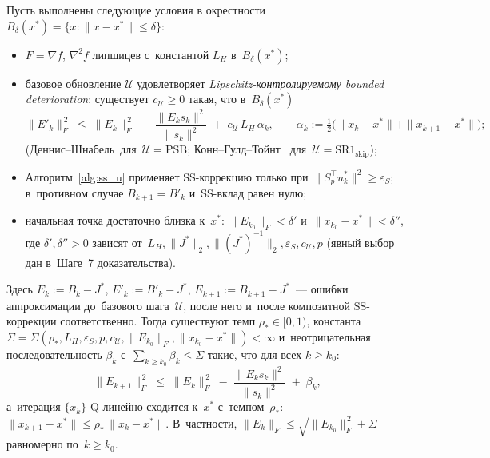 \begin{lemma}
\label{lem:bd_composite}
Пусть выполнены следующие условия в окрестности $B_\delta(x^*)=\{x:\|x-x^*\|\le\delta\}$:
\begin{itemize}
  \item[\textup{(A1)}] $F=\nabla f$, $\nabla^2 f$ липшицев с~константой $L_H$ в~$B_\delta(x^*)$;
  \item[\textup{(A2)}] базовое обновление $\mathcal{U}$ удовлетворяет
        \emph{Lipschitz-контролируемому bounded deterioration}: существует
        $c_{\mathcal{U}}\ge 0$ такая, что в~$B_\delta(x^*)$
        \begin{equation}\label{eq:bd_base}
          \|E'_k\|_F^{\,2}
          \;\le\; \|E_k\|_F^{\,2}
                 \;-\; \frac{\|E_k s_k\|^2}{\|s_k\|^2}
                 \;+\; c_{\mathcal{U}}\, L_H\, \alpha_k,
          \qquad
          \alpha_k:=\tfrac12\bigl(\|x_k-x^*\|+\|x_{k+1}-x^*\|\bigr);
        \end{equation}
        (Деннис--Шнабель~\cite[\S 6.4]{bfgs}для~$\mathcal{U}=\mathrm{PSB}$;
         Конн--Гулд--Тойнт~\cite{conn1991} для~$\mathcal{U}=\mathrm{SR1}_{\mathrm{skip}}$);
  \item[\textup{(A3)}] Алгоритм~\ref{alg:ss_u} применяет SS-коррекцию только при
        $\|S_p^{\top} u_k^*\|^2 \ge \varepsilon_S$; в~противном случае
        $B_{k+1}=B'_k$ и~SS-вклад равен нулю;
  \item[\textup{(A4)}] начальная точка достаточно близка к~$x^{*}$:
        $\|E_{k_0}\|_F < \delta'$ и~$\|x_{k_0}-x^{*}\| < \delta''$, где
        $\delta',\delta''>0$ зависят от~$L_H,\|J^{*}\|_2,\|(J^{*})^{-1}\|_2,
        \varepsilon_S,c_{\mathcal{U}},p$ (явный выбор дан в~Шаге~7
        доказательства).
\end{itemize}
Здесь $E_k:=B_k-J^*$, $E'_k:=B'_k-J^*$, $E_{k+1}:=B_{k+1}-J^*$~---
ошибки аппроксимации до~базового шага~$\mathcal{U}$, после него и~после
композитной SS-коррекции соответственно. Тогда существуют темп $\rho_*\in[0,1)$,
константа $\Sigma=\Sigma(\rho_*,L_H,\varepsilon_S,p,c_{\mathcal{U}},
\|E_{k_0}\|_F,\|x_{k_0}-x^*\|)<\infty$ и~неотрицательная последовательность
$\beta_k$ с~$\sum_{k\ge k_0}\beta_k\le\Sigma$ такие, что для всех $k\ge k_0$:
\begin{equation}\label{eq:bd_composite}
  \|E_{k+1}\|_F^{\,2}
  \;\le\; \|E_k\|_F^{\,2}
         \;-\; \frac{\|E_k s_k\|^2}{\|s_k\|^2}
         \;+\; \beta_k,
\end{equation}
а~итерация $\{x_k\}$ Q-линейно сходится к~$x^{*}$ с~темпом~$\rho_*$:
$\|x_{k+1}-x^{*}\|\le\rho_*\,\|x_k-x^{*}\|$. В~частности,
$\|E_k\|_F\le\sqrt{\|E_{k_0}\|_F^{\,2}+\Sigma}$ равномерно по~$k\ge k_0$.
\end{lemma}

